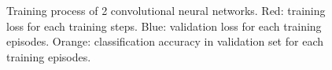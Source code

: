 \documentclass[letterpaper]{article} %
\begin{document}
\begin{figure}[t]



\caption{Training process of 2 convolutional neural networks. Red: training loss for each training steps. Blue: validation loss for each training episodes. Orange: classification accuracy in validation set for each training episodes.}

\end{figure}
\end{document}
